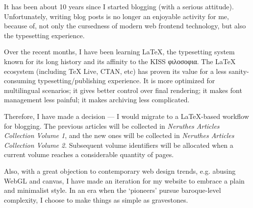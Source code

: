 
It has been about 10 years since I started blogging (with a serious attitude).
Unfortunately, writing blog posts is no longer an enjoyable activity for me,
because of, not only the cursedness of modern web frontend technology,
but also the typesetting experience.

Over the recent months, I have been learning LaTeX,
the typesetting system known for its long history and its affinity to the KISS φιλοσοφια.
The LaTeX ecosystem (including TeX Live, CTAN, etc)
has proven its value for a less sanity-consuming typesetting/publishing experience.
It is more optimized for multilingual scenarios; it gives better control over final rendering;
it makes font management less painful; it makes archiving less complicated.

Therefore, I have made a decision ---
I would migrate to a LaTeX-based workflow for blogging.
The previous articles will be collected in \textit{Neruthes Articles Collection Volume 1},
and the new ones will be collected in \textit{Neruthes Articles Collection Volume 2}.
Subsequent volume identifiers will be allocated when a current volume reaches a considerable quantity of pages.

Also, with a great objection to contemporary web design trends,
e.g. abusing WebGL and canvas,
I have made an iteration for my website to embrace a plain and minimalist style.
In an era when the `pioneers' pursue baroque-level complexity,
I choose to make things as simple as gravestones.
